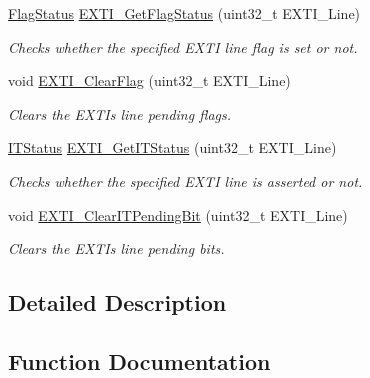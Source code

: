 \begin{DoxyCompactItemize}
\mbox{\hyperlink{group___exported__types_ga89136caac2e14c55151f527ac02daaff}{Flag\+Status}} \mbox{\hyperlink{group___e_x_t_i___exported___functions_ga0ce06e6b312592df149800d63218cffa}{E\+X\+T\+I\+\_\+\+Get\+Flag\+Status}} (uint32\+\_\+t E\+X\+T\+I\+\_\+\+Line)
\begin{DoxyCompactList}\small\item\em Checks whether the specified E\+X\+TI line flag is set or not. \end{DoxyCompactList}\item 
void \mbox{\hyperlink{group___e_x_t_i___exported___functions_ga8e07aaaa286dea4803605d5968850a92}{E\+X\+T\+I\+\_\+\+Clear\+Flag}} (uint32\+\_\+t E\+X\+T\+I\+\_\+\+Line)
\begin{DoxyCompactList}\small\item\em Clears the E\+X\+TI\textquotesingle{}s line pending flags. \end{DoxyCompactList}\item 
\mbox{\hyperlink{group___exported__types_gaacbd7ed539db0aacd973a0f6eca34074}{I\+T\+Status}} \mbox{\hyperlink{group___e_x_t_i___exported___functions_gaf7b51519062ae42fd27ee689cab364aa}{E\+X\+T\+I\+\_\+\+Get\+I\+T\+Status}} (uint32\+\_\+t E\+X\+T\+I\+\_\+\+Line)
\begin{DoxyCompactList}\small\item\em Checks whether the specified E\+X\+TI line is asserted or not. \end{DoxyCompactList}\item 
void \mbox{\hyperlink{group___e_x_t_i___exported___functions_ga3652a7e682728b310c124e7e974d1468}{E\+X\+T\+I\+\_\+\+Clear\+I\+T\+Pending\+Bit}} (uint32\+\_\+t E\+X\+T\+I\+\_\+\+Line)
\begin{DoxyCompactList}\small\item\em Clears the E\+X\+TI\textquotesingle{}s line pending bits. \end{DoxyCompactList}\end{DoxyCompactItemize}


\subsection{Detailed Description}


\subsection{Function Documentation}
\mbox{\label{group___e_x_t_i___exported___functions_ga8e07aaaa286dea4803605d5968850a92}} 
